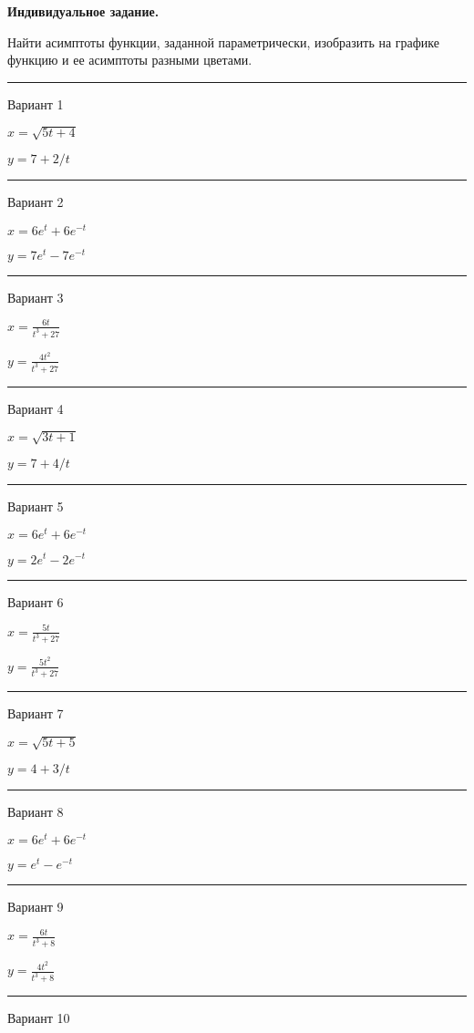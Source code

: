 \documentclass[11pt]{report}
\begin{document}
\pagestyle{empty}

{\bf Индивидуальное задание.}

 
Найти асимптоты функции, заданной параметрически, изобразить на графике функцию и ее асимптоты разными цветами.

\rule{\textwidth}{.2mm}

 Вариант 1

$x = \sqrt{5 t + 4}$

$y = 7 + 2 / t$

\rule{\textwidth}{.2mm}

 Вариант 2

$x = 6 e^{t} + 6 e^{- t}$

$y = 7 e^{t} - 7 e^{- t}$

\rule{\textwidth}{.2mm}

 Вариант 3

$x = \frac{6 t}{t^{3} + 27}$

$y = \frac{4 t^{2}}{t^{3} + 27}$

\rule{\textwidth}{.2mm}

 Вариант 4

$x = \sqrt{3 t + 1}$

$y = 7 + 4 / t$

\rule{\textwidth}{.2mm}

 Вариант 5

$x = 6 e^{t} + 6 e^{- t}$

$y = 2 e^{t} - 2 e^{- t}$

\rule{\textwidth}{.2mm}

 Вариант 6

$x = \frac{5 t}{t^{3} + 27}$

$y = \frac{5 t^{2}}{t^{3} + 27}$

\rule{\textwidth}{.2mm}

 Вариант 7

$x = \sqrt{5 t + 5}$

$y = 4 + 3 / t$

\rule{\textwidth}{.2mm}

 Вариант 8

$x = 6 e^{t} + 6 e^{- t}$

$y = e^{t} - e^{- t}$

\rule{\textwidth}{.2mm}

 Вариант 9

$x = \frac{6 t}{t^{3} + 8}$

$y = \frac{4 t^{2}}{t^{3} + 8}$

\rule{\textwidth}{.2mm}

 Вариант 10
\end{document}
